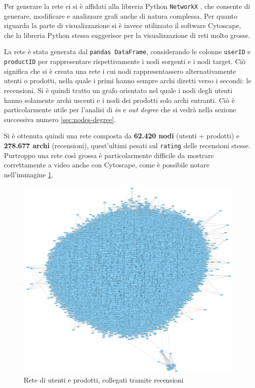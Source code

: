 \documentclass[hidelinks, 12pt]{article}
\begin{document}
Per generare la rete ci si è affidati alla libreria Python \texttt{NetworkX} \cite{site:networkx}, che consente di generare, modificare e analizzare grafi anche di natura complessa. Per quanto riguarda la parte di visualizzazione si è invece utilizzato il software Cytoscape, che la libreria Python stessa suggerisce per la visualizzazione di reti molto grosse.

La rete è stata generata dal \texttt{pandas DataFrame}, considerando le colonne \texttt{userID} e \texttt{productID} per rappresentare rispettivamente i nodi sorgenti e i nodi target. Ciò significa che si è creata una rete i cui nodi rappresentassero alternativamente utenti o prodotti, nella quale i primi hanno sempre archi diretti verso i secondi: le recensioni. Si è quindi tratto un grafo orientato nel quale i nodi degli utenti hanno solamente archi uscenti e i nodi dei prodotti solo archi entranti. Ciò è particolarmente utile per l'analisi di \textit{in} e \textit{out degree} che si vedrà nella sezione successiva numero \ref{sec:nodes-degree}.

Si è ottenuta quindi una rete composta da \textbf{62.420 nodi} (utenti + prodotti) e \textbf{278.677 archi} (recensioni), quest'ultimi pesati sul \texttt{rating} delle recensioni stesse. Purtroppo una rete così grossa è particolarmente difficile da mostrare correttamente a video anche con Cytoscape, come è possibile notare nell'immagine \ref{fig:cyto-net-1}.

\begin{figure}[H]
	\centering
	\includegraphics[scale=0.9]{images/03_01_cyto_net_1.png}
	\caption[Rete di utenti e prodotti, collegati tramite recensioni]{Rete di utenti e prodotti, collegati tramite recensioni}
	\label{fig:cyto-net-1}
\end{figure}
\end{document}
